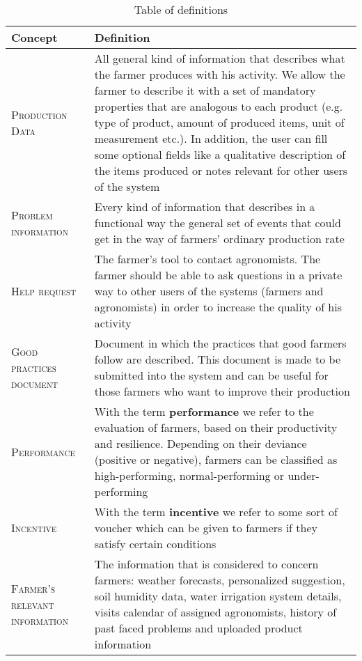 \begin{table}[H]
    \setlength\arrayrulewidth{1pt}
    \centering
    \begin{tabular}{|m{}|m{}|}
        \rowcolor{myblue}
        \hline
        \color{white}Concept & \color{white}Definition \\
        \hline
        \textsc{Production Data}     &   All general kind of information that describes what the farmer produces with his activity. We allow the farmer to describe it with a set of mandatory properties that are analogous to each product (e.g. type of product, amount of produced items, unit of measurement etc.). In addition, the user can fill some optional fields like a qualitative description of the items produced or notes relevant for other users of the system \\
        \hline
        \textsc{Problem information}  &   Every kind of information that describes in a functional way the general set of events that could get in the way of farmers' ordinary production rate \\
        \hline
        \textsc{Help request}     &   The farmer's tool to contact agronomists. The farmer should be able to ask questions in a private way to other users of the systems (farmers and agronomists) in order to increase the quality of his activity \\
        \hline
        \textsc{\nohyphens{Good  practices document}}     &   Document in which the practices that good farmers follow are described. This document is made to be submitted into the system and can be useful for those farmers who want to improve their production \\
        \hline
        \textsc{Performance}     &   With the term \textbf{performance} we refer to the evaluation of farmers, based on their productivity and resilience. Depending on their deviance (positive or negative), farmers can be classified as high-performing, normal-performing or under-performing \\
        \hline
        \textsc{Incentive}  &   With the term \textbf{incentive} we refer to some sort of voucher which can be given to farmers if they satisfy certain conditions \\
        \hline
        \textsc{Farmer's relevant information}  &   The information that is considered to concern farmers: weather forecasts, personalized suggestion, soil humidity data, water irrigation system details, visits calendar of assigned agronomists, history of past faced problems and uploaded product information \\
        \hline
    \end{tabular}
    
    \caption{\label{tab:def}Table of definitions}
    
\end{table}

